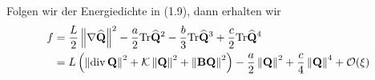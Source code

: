 \documentclass[a4paper,11pt]{scrartcl}
\newcommand{\Tr}{\text{Tr}}
\newcommand{\landau}{\mathcal{O}}
\newcommand{\Qb}{\mathbf{Q}}
\newcommand{\QExt}{\extend{\Qb}}
\newcommand{\Bb}{\mathbf{B}}
\begin{document}
Folgen wir der Energiedichte in \cite{Mucci2012} (1.9), dann erhalten wir
\begin{align}
  f &= \frac{L}{2}\left\| \nabla\QExt \right\|^{2} - \frac{a}{2}\Tr\QExt^{2}  -\frac{b}{3}\Tr\QExt^{3} + \frac{c}{2}\Tr\QExt^{4} \\
    &= L \left( \left\| \div\Qb \right\|^{2} + \gaussianCurvature\left\| \Qb \right\|^{2} + \left\| \Bb\Qb \right\|^{2}\right) 
       -\frac{a}{2} \left\| \Qb \right\|^{2}  + \frac{c}{4}\left\| \Qb \right\|^{4 } + \landau(\xi)
\end{align}





\end{document}
